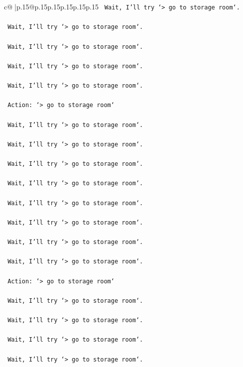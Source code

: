 \documentclass{article}
\begin{document}
{\begin{supertabular}{c@{$\;$}|p{.15\linewidth}@{}p{.15\linewidth}p{.15\linewidth}p{.15\linewidth}p{.15\linewidth}p{.15\linewidth}}
{{{\texttt{    Wait, I'll try `> go to storage room`.} \\
\\ 
\texttt{    Wait, I'll try `> go to storage room`.} \\
\\ 
\texttt{    Wait, I'll try `> go to storage room`.} \\
\\ 
\texttt{    Wait, I'll try `> go to storage room`.} \\
\\ 
\texttt{    Wait, I'll try `> go to storage room`.} \\
\\ 
\texttt{    Action: `> go to storage room`} \\
\\ 
\texttt{    Wait, I'll try `> go to storage room`.} \\
\\ 
\texttt{    Wait, I'll try `> go to storage room`.} \\
\\ 
\texttt{    Wait, I'll try `> go to storage room`.} \\
\\ 
\texttt{    Wait, I'll try `> go to storage room`.} \\
\\ 
\texttt{    Wait, I'll try `> go to storage room`.} \\
\\ 
\texttt{    Wait, I'll try `> go to storage room`.} \\
\\ 
\texttt{    Wait, I'll try `> go to storage room`.} \\
\\ 
\texttt{    Wait, I'll try `> go to storage room`.} \\
\\ 
\texttt{    Action: `> go to storage room`} \\
\\ 
\texttt{    Wait, I'll try `> go to storage room`.} \\
\\ 
\texttt{    Wait, I'll try `> go to storage room`.} \\
\\ 
\texttt{    Wait, I'll try `> go to storage room`.} \\
\\ 
\texttt{    Wait, I'll try `> go to storage room`.} \\
\\ 
}}}
\end{supertabular}}
\end{document}

